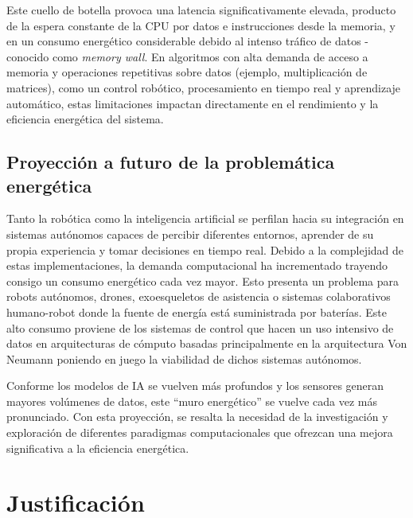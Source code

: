 \documentclass[12pt]{article}
\begin{document}
{Este cuello de botella provoca una latencia significativamente elevada, producto de la espera constante de la CPU por datos e instrucciones desde la memoria, y en un consumo energético considerable debido al intenso tráfico de datos -conocido como \textit{memory wall}. En algoritmos con alta demanda de acceso a memoria y operaciones repetitivas sobre datos (ejemplo, multiplicación de matrices), como un control robótico, procesamiento en tiempo real y aprendizaje automático, estas limitaciones impactan directamente en el rendimiento y la eficiencia energética del sistema.

\subsection{Proyección a futuro de la problemática energética}
Tanto la robótica como la inteligencia artificial se perfilan hacia su integración en sistemas autónomos capaces de percibir diferentes entornos, aprender de su propia experiencia y tomar decisiones en tiempo real. Debido a la complejidad de estas implementaciones, la demanda computacional ha incrementado trayendo consigo un consumo energético cada vez mayor\cite{deVriesGao2025AIenergy, DomingoReguero2025EnergyEfficient}. Esto presenta un problema para robots autónomos, drones, exoesqueletos de asistencia o sistemas colaborativos humano-robot donde la fuente de energía está suministrada por baterías. Este alto consumo proviene de los sistemas de control que hacen un uso intensivo de datos en arquitecturas de cómputo basadas principalmente en la arquitectura Von Neumann poniendo en juego la viabilidad de dichos sistemas autónomos.

Conforme los modelos de IA se vuelven más profundos y los sensores generan mayores volúmenes de datos, este ``muro energético'' se vuelve cada vez más pronunciado. Con esta proyección, se resalta la necesidad de la investigación y exploración de diferentes paradigmas computacionales que ofrezcan una mejora significativa a la eficiencia energética.


\section{Justificación}



}
\end{document}
